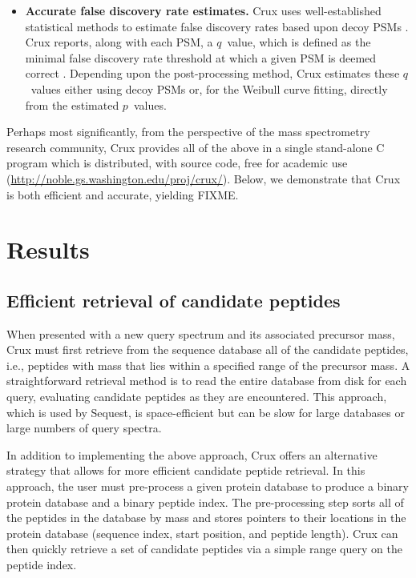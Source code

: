 \documentclass[12pt]{article}
\begin{document}
\begin{itemize}
\item {\bf Accurate false discovery rate estimates.}  Crux uses
  well-established statistical methods to estimate false discovery
  rates based upon decoy PSMs \cite{benjamini:controlling}.  Crux
  reports, along with each PSM, a $q$~value, which is defined as the
  minimal false discovery rate threshold at which a given PSM is
  deemed correct \cite{storey:statistical}.  Depending upon the
  post-processing method, Crux estimates these $q$~values either using
  decoy PSMs or, for the Weibull curve fitting, directly from the
  estimated $p$~values.

\end{itemize}

Perhaps most significantly, from the perspective of the mass
spectrometry research community, Crux provides all of the above in a
single stand-alone C program which is distributed, with source code,
free for academic use (\url{http://noble.gs.washington.edu/proj/crux/}).
Below, we demonstrate that Crux is both
efficient and accurate, yielding FIXME.

\section{Results}

\subsection{Efficient retrieval of candidate peptides}

When presented with a new query spectrum and its associated precursor
mass, Crux must first retrieve from the sequence database all of the
candidate peptides, i.e., peptides with mass that lies within a specified
range of the precursor mass.  A straightforward retrieval method is to
read the entire database from disk for each query, evaluating
candidate peptides as they are encountered.  This approach, which is
used by {\sc Sequest}, is space-efficient but can be slow for large
databases or large numbers of query spectra.

In addition to implementing the above approach, Crux offers an
alternative strategy that allows for more efficient candidate peptide
retrieval.  In this approach, the user must pre-process a given
protein database to produce a binary protein database and a binary
peptide index.  The pre-processing step sorts all of the peptides in
the database by mass and stores pointers to their locations in the
protein database (sequence index, start position, and peptide length).
Crux can then quickly retrieve a set of candidate peptides via a
simple range query on the peptide index.
\end{document}
